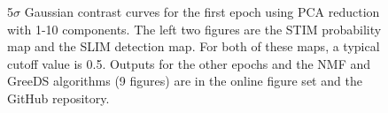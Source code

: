 \figsetgrpstart
{}
\figsetgrpend

\figsetend


\begin{figure}[h!]
    \centering
    \caption{5$\sigma$ Gaussian contrast curves for the first epoch using PCA reduction with 1-10 components. The left two figures are the STIM probability map and the SLIM detection map. For both of these maps, a typical cutoff value is 0.5. Outputs for the other epochs and the NMF and GreeDS algorithms (9 figures) are in the online figure set and the GitHub repository.}
    \label{fig:pca-contrast-curves}
\end{figure}
